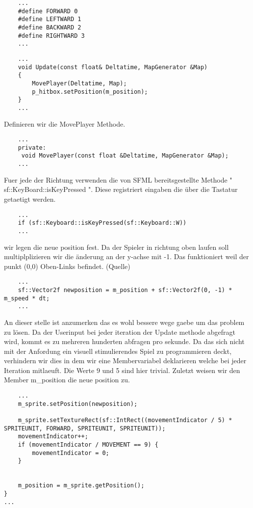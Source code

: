 \begin{lstlisting}
	...
	#define FORWARD 0
	#define LEFTWARD 1
	#define BACKWARD 2
	#define RIGHTWARD 3
	...
\end{lstlisting}

\begin{lstlisting}
	...
	void Update(const float& Deltatime, MapGenerator &Map)
	{
		MovePlayer(Deltatime, Map);
		p_hitbox.setPosition(m_position);
	}
	...
\end{lstlisting}

Definieren wir die MovePlayer Methode. 
\begin{lstlisting}
	...
	private: 
	 void MovePlayer(const float &Deltatime, MapGenerator &Map); 
	...
\end{lstlisting}

Fuer jede der Richtung verwenden die von SFML bereitsgestellte Methode " sf::KeyBoard::isKeyPressed ". Diese registriert eingaben die über die Tastatur getaetigt werden. 

\begin{lstlisting}
	...
	if (sf::Keyboard::isKeyPressed(sf::Keyboard::W))
	...
\end{lstlisting}

wir legen die neue position fest. Da der Spieler in richtung oben laufen soll multiplplizieren wir die änderung an der y-achse mit -1. Das funktioniert weil der 
punkt (0,0) Oben-Links befindet. (Quelle)  

\begin{lstlisting}
	...
	sf::Vector2f newposition = m_position + sf::Vector2f(0, -1) * m_speed * dt; 
	...
\end{lstlisting}

An dieser stelle ist anzumerken das es wohl bessere wege gaebe um das problem zu lösen. Da der Userinput bei jeder iteration der Update methode abgefragt wird, kommt es zu mehreren hunderten abfragen pro sekunde. Da das sich nicht mit der Anfordung ein visuell stimulierendes Spiel zu programmieren deckt, verhindern wir dies in dem wir eine 
Membervariabel deklarieren welche bei jeder Iteration mitlaeuft. Die Werte 9 und 5 sind hier trivial.  
\newline 
Zuletzt weisen wir den Member m\_position die neue position zu.  
\begin{lstlisting}
	...
	m_sprite.setPosition(newposition);

	m_sprite.setTextureRect(sf::IntRect((movementIndicator / 5) * SPRITEUNIT, FORWARD, SPRITEUNIT, SPRITEUNIT));
	movementIndicator++;
	if (movementIndicator / MOVEMENT == 9) {
		movementIndicator = 0;
	}
	

	m_position = m_sprite.getPosition();
}
...
\end{lstlisting}

